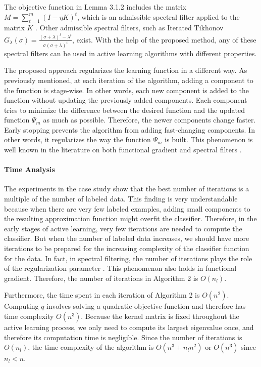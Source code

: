 	The objective function in Lemma 3.1.2 includes the matrix $M = \sum_{t=1}^{m} (I - \eta K)^t$, which is an admissible spectral filter applied to the matrix $K$ \cite{borwein1997convex}. Other admissible spectral filters, such as Iterated Tikhonov $G_\lambda(\sigma) = \frac{(\sigma + \lambda)^t - \lambda^t}{\sigma(\sigma + \lambda)^t}$, exist. With the help of the proposed method, any of these spectral filters can be used in active learning algorithms with different properties.
	
	The proposed approach regularizes the learning function in a different way. As previously mentioned, at each iteration of the algorithm, adding a component to the function is stage-wise. In other words, each new component is added to the function without updating the previously added components. Each component tries to minimize the difference between the desired function and the updated function $\Psi_m$ as much as possible. Therefore, the newer components change faster. Early stopping prevents the algorithm from adding fast-changing components. In other words, it regularizes the way the function $\Psi_m$ is built. This phenomenon is well known in the literature on both functional gradient and spectral filters \cite{borwein1997convex, friedman2001greedy}.
	
	\paragraph{Time Analysis}
	The experiments in the case study show that the best number of iterations is a multiple of the number of labeled data. This finding is very understandable because when there are very few labeled examples, adding small components to the resulting approximation function might overfit the classifier. Therefore, in the early stages of active learning, very few iterations are needed to compute the classifier. But when the number of labeled data increases, we should have more iterations to be prepared for the increasing complexity of the classifier function for the data. In fact, in spectral filtering, the number of iterations plays the role of the regularization parameter \cite{borwein1997convex}. This phenomenon also holds in functional gradient. Therefore, the number of iterations in Algorithm 2 is $O(n_l)$.
	
	Furthermore, the time spent in each iteration of Algorithm 2 is $O(n^2)$. Computing $q$ involves solving a quadratic objective function and therefore has time complexity $O(n^3)$. Because the kernel matrix is fixed throughout the active learning process, we only need to compute its largest eigenvalue once, and therefore its computation time is negligible. Since the number of iterations is $O(n_l)$, the time complexity of the algorithm is $O(n^3 + n_l n^2)$ or $O(n^3)$ since $n_l < n$.
	
